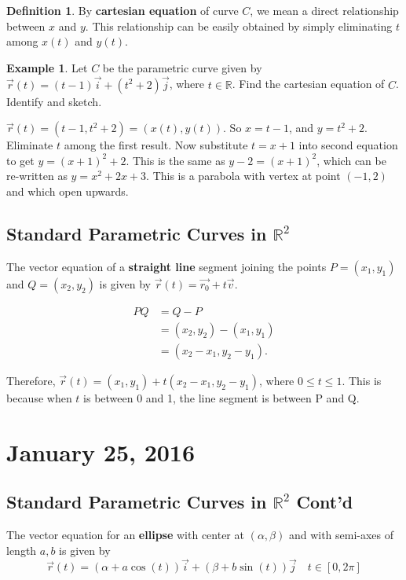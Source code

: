 \documentclass[11pt]{article}
\theoremstyle{plain} %
\theoremstyle{definition}
\newtheorem*{definition}{Definition} %
\theoremstyle{example}
\newtheorem*{example}{Example}
\theoremstyle{remark}
\begin{document}
\begin{definition}
By \textbf{cartesian equation} of curve $C$, we mean a direct relationship between $x$ and $y$. This relationship can be easily obtained by simply eliminating $t$ among $x(t)$ and $y(t)$. 
\end{definition}

\begin{example}
Let $C$ be the parametric curve given by $\vec{r}(t) = (t-1)\vec{i} + (t^2+2)\vec{j}$, where $t \in \mathbb R$. Find the cartesian equation of $C$. Identify and sketch. 
\end{example}


$\vec{r}(t) = (t-1, t^2+2) = (x(t), y(t))$. So $x = t-1$, and $y=t^2+2$. Eliminate $t$ among the first result. Now substitute $t=x+1$ into second equation to get $y = (x+1)^2+2$. This is the same as $y- 2 = (x+1)^2$, which can be re-written as $y = x^2+2x+3$. This is a parabola with vertex at point $(-1, 2)$ and which open upwards. 

\subsection{Standard Parametric Curves in $\mathbb R^2$}


The vector equation of a \textbf{straight line} segment joining the points $P = (x_1, y_1)$ and $Q = (x_2, y_2)$ is given by $\vec{r}(t) = \vec{r_0} +t\vec{v}$. 
	
	\begin{align*}
	PQ &= Q-P \\
	&= (x_2, y_2) - (x_1,y_1)\\
	&= (x_2-x_1,y_2-y_1) . 
	\end{align*}
	
	Therefore, $\vec{r}(t) = (x_1,y_1) + t(x_2-x_1, y_2-y_1)$, where $0 \leq t \leq1$. This is because when $t$ is between 0 and 1, the line segment is between P and Q. 

\section{January 25, 2016}
\subsection{Standard Parametric Curves in $\mathbb R^2$ Cont'd}

The vector equation for an \textbf{ellipse} with center at $(\alpha, \beta)$ and with semi-axes of length $a, b$ is given by $$\vec{r}(t) = \left(\alpha + a\cos(t)\right)\vec{i} + \left(\beta + b\sin(t)\right)\vec{j} \quad t \in [0, 2\pi]$$
\end{document}
